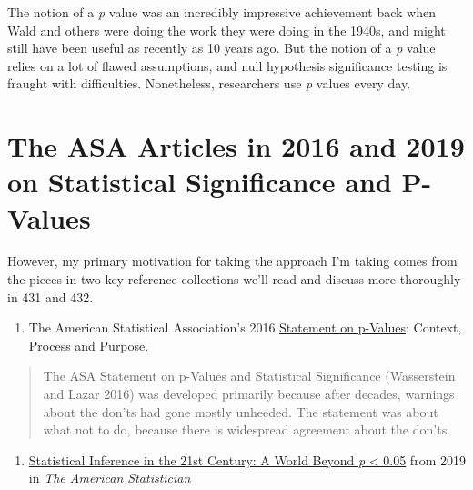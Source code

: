 \documentclass[
]{book}
\providecommand{\tightlist}{%
  \setlength{\itemsep}{0pt}\setlength{\parskip}{0pt}}
\begin{document}
The notion of a \emph{p} value was an incredibly impressive achievement back when Wald and others were doing the work they were doing in the 1940s, and might still have been useful as recently as 10 years ago. But the notion of a \emph{p} value relies on a lot of flawed assumptions, and null hypothesis significance testing is fraught with difficulties. Nonetheless, researchers use \emph{p} values every day.

\hypertarget{the-asa-articles-in-2016-and-2019-on-statistical-significance-and-p-values}{%
\section{The ASA Articles in 2016 and 2019 on Statistical Significance and P-Values}\label{the-asa-articles-in-2016-and-2019-on-statistical-significance-and-p-values}}

However, my primary motivation for taking the approach I'm taking comes from the pieces in two key reference collections we'll read and discuss more thoroughly in 431 and 432.

\begin{enumerate}
\def\labelenumi{\arabic{enumi}.}
\tightlist
\item
  The American Statistical Association's 2016 \href{http://amstat.tandfonline.com/doi/full/10.1080/00031305.2016.1154108}{Statement on p-Values}: Context, Process and Purpose.
\end{enumerate}

\begin{quote}
The ASA Statement on p-Values and Statistical Significance (Wasserstein and Lazar 2016) was developed primarily because after decades, warnings about the don'ts had gone mostly unheeded. The statement was about what not to do, because there is widespread agreement about the don'ts.
\end{quote}

\begin{enumerate}
\def\labelenumi{\arabic{enumi}.}
\setcounter{enumi}{1}
\tightlist
\item
  \href{https://amstat.tandfonline.com/toc/utas20/73/sup1}{Statistical Inference in the 21st Century: A World Beyond \emph{p} \textless{} 0.05} from 2019 in \emph{The American Statistician}
\end{enumerate}
\end{document}
